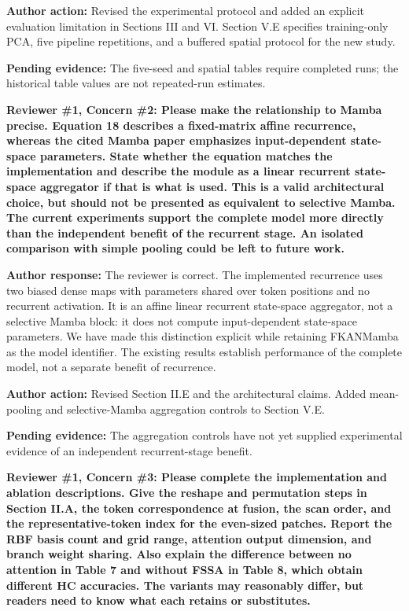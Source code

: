 \documentclass[a4paper,onecolumn,11pt]{IEEEtran}
\newcommand{\pending}[1]{\par\noindent\textcolor{red!70!black}{\textbf{Pending evidence:} #1}\par}
\begin{document}
\textbf{Author action:}
Revised the experimental protocol and added an explicit evaluation limitation in Sections III and VI. Section V.E specifies training-only PCA, five pipeline repetitions, and a buffered spatial protocol for the new study. \pending{The five-seed and spatial tables require completed runs; the historical table values are not repeated-run estimates.}

\vspace{1.5em}
{\color{reviewgreen}\textbf{Reviewer \#1, Concern \#2: Please make the relationship to Mamba precise. Equation 18 describes a fixed-matrix affine recurrence, whereas the cited Mamba paper emphasizes input-dependent state-space parameters. State whether the equation matches the implementation and describe the module as a linear recurrent state-space aggregator if that is what is used. This is a valid architectural choice, but should not be presented as equivalent to selective Mamba. The current experiments support the complete model more directly than the independent benefit of the recurrent stage. An isolated comparison with simple pooling could be left to future work.}}

\textbf{Author response:}
The reviewer is correct. The implemented recurrence uses two biased dense maps with parameters shared over token positions and no recurrent activation. It is an affine linear recurrent state-space aggregator, not a selective Mamba block: it does not compute input-dependent state-space parameters. We have made this distinction explicit while retaining FKANMamba as the model identifier. The existing results establish performance of the complete model, not a separate benefit of recurrence.

\textbf{Author action:}
Revised Section II.E and the architectural claims. Added mean-pooling and selective-Mamba aggregation controls to Section V.E. \pending{The aggregation controls have not yet supplied experimental evidence of an independent recurrent-stage benefit.}

\vspace{1.5em}
{\color{reviewgreen}\textbf{Reviewer \#1, Concern \#3: Please complete the implementation and ablation descriptions. Give the reshape and permutation steps in Section II.A, the token correspondence at fusion, the scan order, and the representative-token index for the even-sized patches. Report the RBF basis count and grid range, attention output dimension, and branch weight sharing. Also explain the difference between no attention in Table 7 and without FSSA in Table 8, which obtain different HC accuracies. The variants may reasonably differ, but readers need to know what each retains or substitutes.}}
\end{document}
